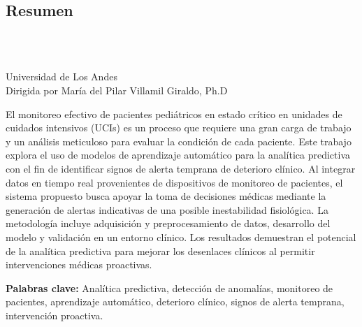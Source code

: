 \begin{titlepage}
    \centering
    \newpage
    \pagestyle{empty}

\chapter*{Resumen}
\vspace{0.5cm}

{\bf\centering \ThesisTitle} \\
\vspace{0.8cm}

\begin{flushright}
    \AuthorName \\
    Universidad de Los Andes \\
    Dirigida por María del Pilar Villamil Giraldo, Ph.D
\end{flushright}

\vspace{0.8cm}


\justifying El monitoreo efectivo de pacientes pediátricos en estado crítico en unidades de cuidados intensivos (UCIs) es un proceso que requiere una gran carga de trabajo y un análisis meticuloso para evaluar la condición de cada paciente. Este trabajo explora el uso de modelos de aprendizaje automático para la analítica predictiva con el fin de identificar signos de alerta temprana de deterioro clínico. Al integrar datos en tiempo real provenientes de dispositivos de monitoreo de pacientes, el sistema propuesto busca apoyar la toma de decisiones médicas mediante la generación de alertas indicativas de una posible inestabilidad fisiológica. La metodología incluye adquisición y preprocesamiento de datos, desarrollo del modelo y validación en un entorno clínico. Los resultados demuestran el potencial de la analítica predictiva para mejorar los desenlaces clínicos al permitir intervenciones médicas proactivas.  

\begin{flushleft}  
\vspace{0.5cm}  
\textbf{Palabras clave:} Analítica predictiva, detección de anomalías, monitoreo de pacientes, aprendizaje automático, deterioro clínico, signos de alerta temprana, intervención proactiva.  


\end{flushleft}

\end{titlepage}
